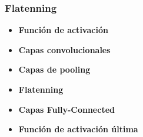 \subsubsection{Flatenning}



\begin{itemize}
    \item \textbf{Función de activación}
    \item \textbf{Capas convolucionales}
    \item \textbf{Capas de pooling}
    \item \textbf{Flatenning}
    \item \textbf{Capas Fully-Connected}
    \item \textbf{Función de activación última}
\end{itemize}












